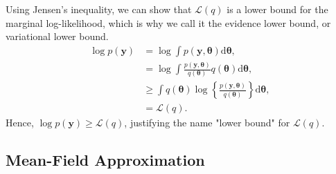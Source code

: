\documentclass{article}
\begin{document}
\newline
%
Using Jensen's inequality, we can show that $\mathcal{L}(q)$ is a lower bound for the marginal log-likelihood, which is why we call it the evidence lower bound, or variational lower bound.
\begin{align*}
\log p(\boldsymbol{y}) &= \log \int p(\boldsymbol{y}, \boldsymbol{\theta}) \mathrm{d}\boldsymbol{\theta},\\
&= \log \int \frac{p(\boldsymbol{y}, \boldsymbol{\theta})}{q(\boldsymbol{\theta})}q(\boldsymbol{\theta})\mathrm{d}\boldsymbol{\theta}
,\\
&\geq \int q(\boldsymbol{\theta}) \log \left\lbrace \frac{p(\boldsymbol{y}, \boldsymbol{\theta})}{q(\boldsymbol{\theta})} \right\rbrace \mathrm{d}\boldsymbol{\theta},\\
&= \mathcal{L}(q).
\end{align*}
Hence, $\log p(\boldsymbol{y}) \geq \mathcal{L}(q)$, justifying the name "lower bound" for $\mathcal{L}(q)$.

\subsection{Mean-Field Approximation}

\newpage


\end{document}
